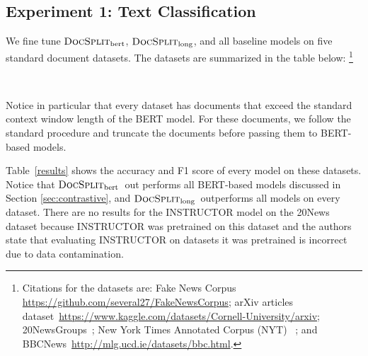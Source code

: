 \documentclass[11pt]{article}
\newcommand{\our}{\mbox{\textsc{DocSplit}}}
\newcommand{\ourbert}{$\our_{\mathrm{bert}}$}
\newcommand{\ourlong}{$\our_{\mathrm{long}}$}
\begin{document}
\subsection{Experiment 1: Text Classification}
%
We fine tune \ourbert, \ourlong, and all baseline models on five standard document datasets.
The datasets are summarized in the table below:%
\footnote{Citations for the datasets are:
Fake News Corpus \url{https://github.com/several27/FakeNewsCorpus};
arXiv articles dataset~\url{https://www.kaggle.com/datasets/Cornell-University/arxiv};
20NewsGroups~\cite{Lang1995NewsWeederLT};
New York Times Annotated Corpus (NYT) ~\cite{sandhaus2008new}; and
BBCNews~\url{http://mlg.ucd.ie/datasets/bbc.html}.
}

\begin{table}[H]
\centering
~~
\label{dataset}
\end{table}

\noindent
Notice in particular that every dataset has documents that exceed the standard context window length of the BERT model.
For these documents, we follow the standard procedure and truncate the documents before passing them to BERT-based models.

Table~\ref{results} shows the accuracy and F1 score of every model on these datasets.
Notice that \ourbert~out performs all BERT-based models discussed in Section \ref{sec:contrastive},
and \ourlong~outperforms all models on every dataset.
There are no results for the INSTRUCTOR model on the 20News dataset because INSTRUCTOR was pretrained on this dataset and the authors state that evaluating INSTRUCTOR on datasets it was pretrained is incorrect due to data contamination.
\end{document}
